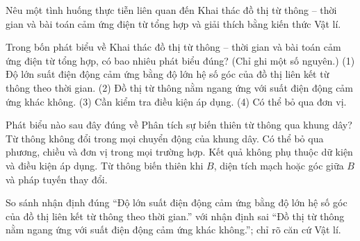 \begin{bt}
Nêu một tình huống thực tiễn liên quan đến Khai thác đồ thị từ thông – thời gian và bài toán cảm ứng điện từ tổng hợp và giải thích bằng kiến thức Vật lí.
\end{bt}

\begin{ex}
Trong bốn phát biểu về Khai thác đồ thị từ thông – thời gian và bài toán cảm ứng điện từ tổng hợp, có bao nhiêu phát biểu đúng? (Chỉ ghi một số nguyên.) (1) Độ lớn suất điện động cảm ứng bằng độ lớn hệ số góc của đồ thị liên kết từ thông theo thời gian. (2) Đồ thị từ thông nằm ngang ứng với suất điện động cảm ứng khác không. (3) Cần kiểm tra điều kiện áp dụng. (4) Có thể bỏ qua đơn vị.
\end{ex}

\begin{ex}
Phát biểu nào sau đây đúng về Phân tích sự biến thiên từ thông qua khung dây?
\choice
{Từ thông không đổi trong mọi chuyển động của khung dây.}
{Có thể bỏ qua phương, chiều và đơn vị trong mọi trường hợp.}
{Kết quả không phụ thuộc dữ kiện và điều kiện áp dụng.}
{\True Từ thông biến thiên khi $B$, diện tích mạch hoặc góc giữa $B$ và pháp tuyến thay đổi.}
\end{ex}

\begin{bt}
So sánh nhận định đúng “Độ lớn suất điện động cảm ứng bằng độ lớn hệ số góc của đồ thị liên kết từ thông theo thời gian.” với nhận định sai “Đồ thị từ thông nằm ngang ứng với suất điện động cảm ứng khác không.”; chỉ rõ căn cứ Vật lí.
\end{bt}

